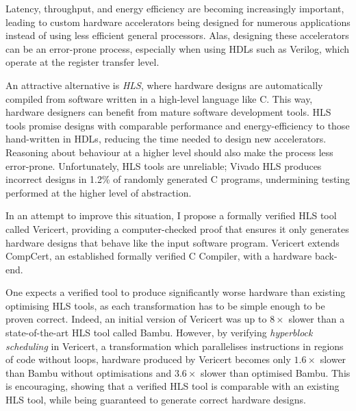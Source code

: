 
Latency, throughput, and energy efficiency are becoming increasingly important,
leading to custom hardware accelerators being designed for numerous applications
instead of using less efficient general processors.  Alas, designing these
accelerators can be an error-prone process, especially when using
\glspl{HDL} such as Verilog, which operate at the register transfer
level.

An attractive alternative is \emph{\gls{HLS}}, where hardware designs are
automatically compiled from software written in a high-level language like C.
This way, hardware designers can benefit from mature software development tools.  \gls{HLS} tools promise
designs with comparable performance and energy-efficiency to those hand-written
in \glspl{HDL}, reducing the time needed to design new accelerators.  Reasoning about behaviour at a higher level should also make the process
less error-prone.  Unfortunately, \gls{HLS} tools are
unreliable; Vivado HLS produces incorrect designs in 1.2\% of randomly generated
C programs, undermining testing performed at the higher level of
abstraction.

In an attempt to improve this situation, I propose a formally verified \gls{HLS}
tool called Vericert, providing a computer-checked proof that ensures it only
generates hardware designs that behave like the input software program.
Vericert extends CompCert, an established formally verified C Compiler, with a
hardware back-end.

One expects a verified tool to produce significantly worse hardware than
existing optimising \gls{HLS} tools, as each transformation has to be simple
enough to be proven correct.  Indeed, an initial version of Vericert was up to $8\times$ slower than a state-of-the-art \gls{HLS} tool
called Bambu.  However, by verifying
\emph{hyperblock scheduling} in Vericert, a transformation which parallelises instructions in regions of code without loops, hardware produced by
Vericert becomes only $1.6\times$ slower than Bambu without optimisations
and $3.6\times$ slower than optimised Bambu.  This is
encouraging, showing that a verified \gls{HLS} tool is comparable with an
existing \gls{HLS} tool, while being
guaranteed to generate correct hardware designs.

